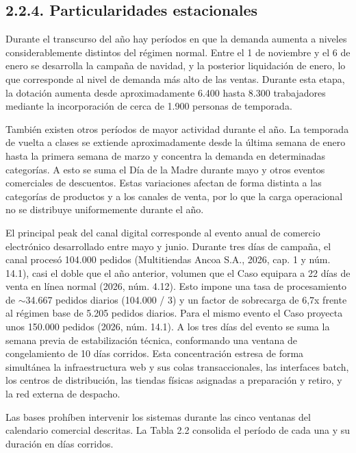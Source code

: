 \documentclass[11pt]{article}
\begin{document}
\subsection{2.2.4. Particularidades estacionales}\label{particularidades-estacionales}

Durante el transcurso del año hay períodos en que la demanda aumenta a niveles considerablemente distintos del régimen normal. Entre el 1 de noviembre y el 6 de enero se desarrolla la campaña de navidad, y la posterior liquidación de enero, lo que corresponde al nivel de demanda más alto de las ventas. Durante esta etapa, la dotación aumenta desde aproximadamente 6.400 hasta 8.300 trabajadores mediante la incorporación de cerca de 1.900 personas de temporada.

También existen otros períodos de mayor actividad durante el año. La temporada de vuelta a clases se extiende aproximadamente desde la última semana de enero hasta la primera semana de marzo y concentra la demanda en determinadas categorías. A esto se suma el Día de la Madre durante mayo y otros eventos comerciales de descuentos. Estas variaciones afectan de forma distinta a las categorías de productos y a los canales de venta, por lo que la carga operacional no se distribuye uniformemente durante el año.

El principal peak del canal digital corresponde al evento anual de comercio electrónico desarrollado entre mayo y junio. Durante tres días de campaña, el canal procesó 104.000 pedidos (Multitiendas Ancoa S.A., 2026, cap. 1 y núm. 14.1), casi el doble que el año anterior, volumen que el Caso equipara a 22 días de venta en línea normal (2026, núm. 4.12). Esto impone una tasa de procesamiento de $\sim$34.667 pedidos diarios (104.000 / 3) y un factor de sobrecarga de 6,7x frente al régimen base de 5.205 pedidos diarios. Para el mismo evento el Caso proyecta unos 150.000 pedidos (2026, núm. 14.1). A los tres días del evento se suma la semana previa de estabilización técnica, conformando una ventana de congelamiento de 10 días corridos. Esta concentración estresa de forma simultánea la infraestructura web y sus colas transaccionales, las interfaces batch, los centros de distribución, las tiendas físicas asignadas a preparación y retiro, y la red externa de despacho.

Las bases prohíben intervenir los sistemas durante las cinco ventanas del calendario comercial descritas. La Tabla 2.2 consolida el período de cada una y su duración en días corridos.
\end{document}
